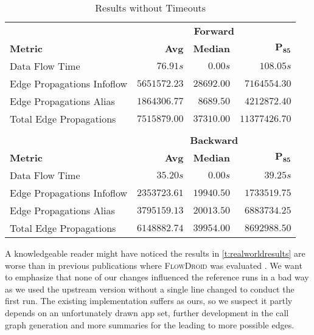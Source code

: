 \documentclass[../draft.tex]{subfiles}
\begin{document}
    \begin{table}[tbp]
        \centering
        \begin{tabular}{l | r | r | r}
            & \multicolumn{3}{c}{\textbf{Forward}}\\
            \textbf{Metric} & \textbf{Avg} & \textbf{Median} & $\mathbf{P_{85}}$\\
            \hline\hline
            Data Flow Time & $76.91s$ & $0.00s$ & $108.05s$\\
            \hline
            Edge Propagations Infoflow & $5651572.23$ & $28692.00$ & $7164554.30$\\
            Edge Propagations Alias & $1864306.77$ & $8689.50$ & $4212872.40$\\
            Total Edge Propagations & $7515879.00$ & $37310.00$ & $11377426.70$\\
            \multicolumn{4}{c}{}\\
            & \multicolumn{3}{c}{\textbf{Backward}}\\
            \textbf{Metric} & \textbf{Avg} & \textbf{Median} & $\mathbf{P_{85}}$\\
            \hline\hline
            Data Flow Time & $35.20s$ & $0.00s$ & $39.25s$\\
            \hline
            Edge Propagations Infoflow & $2353723.61$ & $19940.50$ & $1733519.75$\\
            Edge Propagations Alias & $3795159.13$ & $20013.50$ & $6883734.25$\\
            Total Edge Propagations & $6148882.74$ & $39954.00$ & $8692988.50$\\
        \end{tabular}
        \caption{Results without Timeouts}
        \label{t:realworldresultswithouttimeout}
    \end{table}

    A knowledgeable reader might have noticed the results in \autoref{t:realworldresults} are worse than in previous publications where \textsc{FlowDroid} was evaluated \cite{Arzt2017PhD, Arzt2021}.
    We want to emphasize that none of our changes influenced the reference runs in a bad way as we used the upstream version without a single line changed to conduct the first run\footnotemark{}.
    The existing implementation suffers as ours, so we suspect it partly depends on an unfortunately drawn app set, further development in the call graph generation and more summaries for the  leading to more possible edges.
\end{document}
